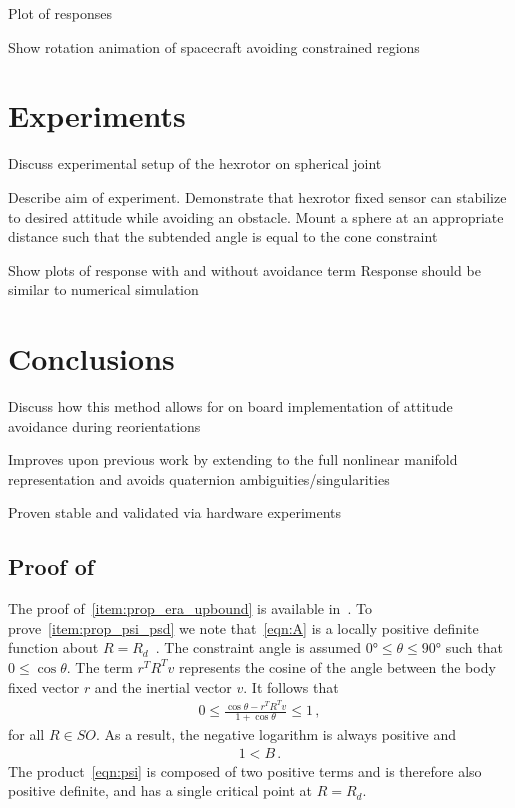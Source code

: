 \documentclass[letterpaper, 10 pt, conference]{ieeeconf}  %
\begin{document}
Plot of responses

Show rotation animation of spacecraft avoiding constrained regions

\section{Experiments}

Discuss experimental setup of the hexrotor on spherical joint

Describe aim of experiment. 
Demonstrate that hexrotor fixed sensor can stabilize to desired attitude while avoiding an obstacle.
Mount a sphere at an appropriate distance such that the subtended angle is equal to the cone constraint

Show plots of response with and without avoidance term
Response should be similar to numerical simulation

\section{Conclusions}

Discuss how this method allows for on board implementation of attitude avoidance during reorientations

Improves upon previous work by extending to the full nonlinear manifold representation and avoids quaternion ambiguities/singularities

Proven stable and validated via hardware experiments



\appendix
\subsection{Proof of~} \label{proof:config_error}
The proof of~\cref{item:prop_era_upbound} is available in~\cite{lee2011a}.
To prove~\cref{item:prop_psi_psd} we note that~\cref{eqn:A} is a locally positive definite function about \( R = R_d \)~\cite{bullo2004}.
The constraint angle is assumed \( \ang{0} \leq \theta \leq \ang{90} \) such that \( 0 \leq \cos \theta \).
The term \( r^T R^T v \) represents the cosine of the angle between the body fixed vector \( r \) and the inertial vector \( v \). 
It follows that
\begin{align*}
	0 \leq  \frac{\cos \theta -  r^T R^T v}{1 + \cos \theta} \leq 1 \, ,
\end{align*}
for all \( R \in SO \). 
As a result, the negative logarithm is always positive and
\begin{align*}
	1 < B \, .
\end{align*}
The product~\cref{eqn:psi} is composed of two positive terms and is therefore also positive definite, and has a single critical point at \( R = R_d \).
\end{document}
